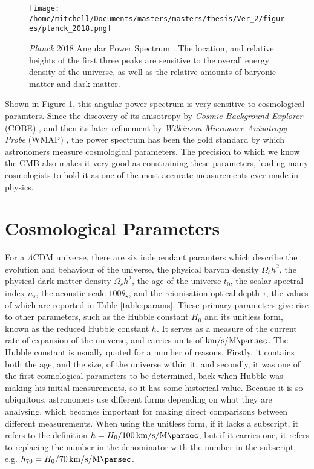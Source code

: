 \begin{figure}[h!]
\centering
\texttt{[image: /home/mitchell/Documents/masters/masters/thesis/Ver\_2/figures/planck\_2018.png]}
\caption{\emph{Planck} 2018 Angular Power Spectrum \citep{2018arXiv180706209P}. The location, and relative heights of the first three peaks are sensitive to the overall energy density of the universe, as well as the relative amounts of baryonic matter and dark matter.}
\label{fig:power_spec}
\end{figure}

Shown in Figure \ref{fig:power_spec}, this angular power spectrum is very sensitive to cosmological paramters. Since the discovery of its anisotropy by \emph{Cosmic Background Explorer} (COBE) \citep{1992PhT....45f..17L}, and then its later refinement by \textit{Wilkinson Microwave Anisotropy Probe} (WMAP) \citep{2007ApJS..170..377S}, the power spectrum has been the gold standard by which astronomers measure cosmological parameters. The precision to which we know the CMB also makes it very good as constraining these parameters, leading many cosmologists to hold it as one of the most accurate measurements ever made in physics.  
\section{Cosmological Parameters}
For a $\Lambda$CDM universe, there are six independant paramters which describe the evolution and behaviour of the universe, the physical baryon density $\Omega_b h^2$, the physical dark matter density $\Omega_c h^2$, the age of the universe $t_0$, the scalar spectral index $n_s$, the acoustic scale $100 \theta_\star$, and the reionisation optical depth $\tau$, the values of which are reported in Table \ref{table:params}. These primary parameters give rise to other parameters, such as the Hubble constant $H_0$ and its unitless form, known as the reduced Hubble constant $h$. It serves as a measure of the current rate of expansion of the universe, and carries units of $ \SI{}{\kilo\meter\per\second\per\mega\parsec}$. The Hubble constant is usually quoted for a number of reasons. Firstly, it contains both the age, and the size, of the universe within it, and secondly, it was one of the first cosmological parameters to be determined, back when Hubble was making his initial measurements, so it has some historical value. Because it is so ubiquitous, astronomers use different forms depending on what they are analysing, which becomes important for making direct comparisons between different measurements. When using the unitless form, if it lacks a subscript, it refers to the definition $h = H_0/\SI{100}{\kilo\meter\per\second\per\mega\parsec}$, but if it carries one, it refers to replacing the number in the denominator with the number in the subscript, e.g. $h_{70} = H_0/\SI{70}{\kilo\meter\per\second\per\mega\parsec}$.

